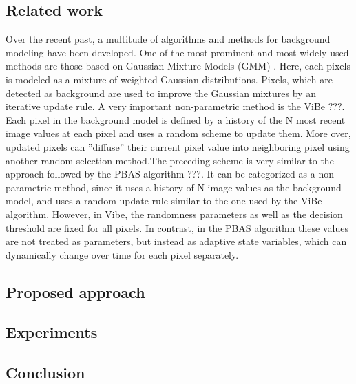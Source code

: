 \subsection*{Related work}
Over the recent past, a multitude of algorithms and methods for background modeling have been developed.
One of the most prominent and most widely used methods are those based on Gaussian Mixture Models (GMM)
\cite{gmm}. Here, each pixels is modeled as a mixture of weighted Gaussian distributions. Pixels, which are detected as background are used to improve the Gaussian mixtures by an iterative update rule. A very important non-parametric method is the ViBe ???. Each pixel in the background model is defined by a history of the N most recent image values at each pixel and uses a random scheme to update them. More over, updated pixels can ”diffuse” their current pixel value into neighboring pixel using another random selection method.The preceding scheme is very similar to the approach followed by the PBAS algorithm ???. It can be categorized as a non-parametric method, since it  uses a history of N image values as the background model, and uses a random update rule similar to the one used by the ViBe algorithm. However, in Vibe, the randomness parameters as well as the decision threshold are fixed for all pixels. In contrast, in the PBAS algorithm these values are not treated as parameters, but instead as adaptive state variables, which can dynamically change over time for each pixel separately.


\subsection*{Proposed approach}


\subsection*{Experiments}


\subsection*{Conclusion}


